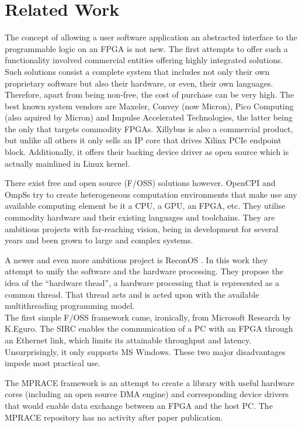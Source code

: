 \chapter{Related Work}

The concept of allowing a user software application an abstracted interface to the programmable logic on an FPGA is not new.
The first attempts to offer such a functionality involved commercial entities offering highly integrated solutions.
Such solutions consist a complete system that includes not only their own proprietary software but also their hardware,
or even, their own languages. Therefore, apart from being non-free, the cost of purchase can be very high. The best known
system vendors are Maxeler, Convey (now Micron), Pico Computing (also aquired by Micron) and Impulse Accelerated Technologies,
the latter being the only that targets commodity FPGAs. Xillybus is also a commercial product, but unlike all others it only
sells an IP core that drives Xilinx PCIe endpoint block. Additionally, it offers their backing device driver as open source
which is actually mainlined in Linux kernel.

There exist free and open source (F/OSS) solutions however. 
OpenCPI and OmpSs try to create heterogeneous computation environments
that make use any available computing element be it a CPU, a GPU, an FPGA, etc. 
They utilise commodity hardware and their existing languages and toolchains. 
They are ambitious projects with far-reaching vision, being in development for
several years and been grown to large and complex systems.

A newer and even more ambitious project is ReconOS \cite{reconos}. 
In this work they attempt to unify the software and the hardware processing.
They propose the idea of the ``hardware thead'', a hardware processing that is represented as a common thread.
That thread acts and is acted upon with the available multithreading programming model.
\\

The first simple F/OSS framework came, ironically, from Microsoft Research by K.Eguro.
The SIRC \cite{sirc} enables the communication of a PC with an FPGA through an Ethernet link, which limits its attainable throughput
and latency.
Unsurprisingly, it only supports MS Windows. These two major disadvantages impede most practical use.

The MPRACE \cite{mprace} framework is an attempt to create a library with useful hardware cores (including an open source DMA engine)
and corresponding device drivers that would enable data exchange between an FPGA and the host PC. 
The MPRACE repository has no activity after paper publication.


